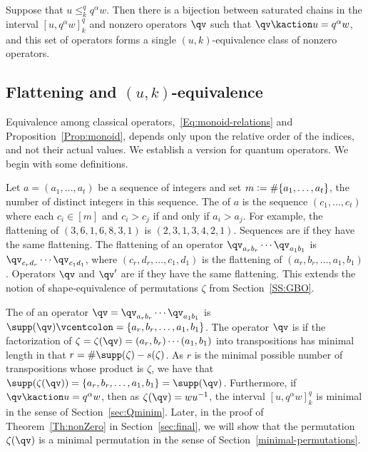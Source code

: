 \begin{proposition}\label{Prop:chains_and_operators}
  Suppose that $u\leq_k^q q^\alpha w$.
  Then there is a bijection between saturated chains in the interval $[u,q^\alpha w]_k^q$ and nonzero operators $\qv$ 
  such that $\qv\kaction u=q^\alpha w$, and this set of operators forms a single $(u,k)$-equivalence class of nonzero operators.
\end{proposition}

\subsection{Flattening and \texorpdfstring{$(u,k)$}{(u,k)}-equivalence}
\label{SS:Shape-equivalence}

Equivalence among classical operators,~\eqref{Eq:monoid-relations} and
Proposition~\ref{Prop:monoid}, depends only upon the relative order of the indices, and not their actual values.
We establish a version for quantum operators.
We begin with some definitions.

Let $a=(a_1,\dotsc,a_t)$ be a sequence of integers and set $m\vcentcolon=\#\{a_1,\dotsc,a_t\}$, the number of distinct
integers in this sequence.
The  of $a$ is the sequence $(c_1,\dotsc,c_t)$ where each $c_i\in[m]$ and $c_i>c_j$ if and only if $a_i>a_j$.
For example, the flattening of $(3,6,1,6,8,3,1)$ is $(2,3,1,3,4,2,1)$.
Sequences are  if they have the same flattening.
The flattening of an operator $\qv_{a_r b_r}\dotsb\qv_{a_1 b_1}$ is  $\qv_{c_r d_r}\dotsb\qv_{c_1 d_1}$, where $(c_r,d_r,\dotsc,c_1,d_1)$  is
the flattening of $(a_r,b_r,\dotsc,a_1,b_1)$.
Operators $\qv$ and $\qv'$ are  if they have the same flattening.
This extends the notion of shape-equivalence of permutations $\zeta$ from Section~\ref{SS:GBO}.

The  of an operator $\qv=\qv_{a_r b_r}\dotsb\qv_{a_1 b_1}$ is $\supp(\qv)\vcentcolon=\{a_r,b_r,\dotsc,a_1,b_1\}$.
The operator $\qv$ is  if the factorization of 
$\zeta=\zeta(\qv)=(a_r,b_r)\dotsb(a_1,b_1)$ into transpositions has minimal length in that
$r=\#\supp(\zeta)-s(\zeta)$.
As $r$ is the minimal possible number of transpositions whose product is $\zeta$, we have that
$\supp(\zeta(\qv))=\{a_r,b_r,\dotsc,a_1,b_1\}=\supp(\qv)$.
Furthermore, if $\qv\kaction u=q^\alpha w$, then as $\zeta(\qv)=wu^{-1}$, the interval $[u,q^\alpha w]_k^q$ is minimal in the
sense of Section~\ref{sec:Qminim}.
Later, in the proof of Theorem~\ref{Th:nonZero} in Section~\ref{sec:final}, we will show that the permutation $\zeta(\qv)$ is a
minimal permutation in the sense of Section~\ref{minimal-permutations}.

